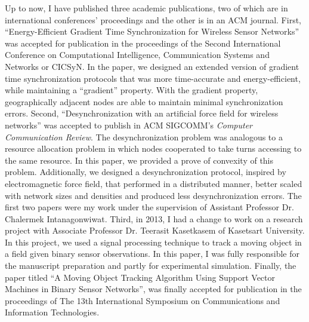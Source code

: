 \documentclass[a4paper,10pt]{report}
\begin{document}
\vspace{0.2cm}
Up to now, I have published three academic publications, two of which are in international conferences' proceedings and the other is in an ACM journal.  First, ``Energy-Efficient Gradient Time Synchronization for Wireless Sensor Networks'' was accepted for publication in the proceedings of the Second International Conference on Computational Intelligence, Communication Systems and Networks or CICSyN. In the paper, we designed an extended version of gradient time synchronization protocols that was more time-accurate and energy-efficient, while maintaining a ``gradient'' property. With the gradient property, geographically adjacent nodes are able to maintain minimal synchronization errors. Second, ``Desynchronization with an artificial force field for wireless networks'' was accepted to publish in ACM SIGCOMM's \textit{Computer Communication Review}. The desynchronization problem was analogous to a resource allocation problem in which nodes cooperated to take turns accessing to the same resource. In this paper, we provided a prove of convexity of this problem. Additionally, we designed a desynchronization protocol, inspired by electromagnetic force field, that performed in a distributed manner, better scaled with network sizes and densities and produced less desynchronization errors. The first two papers were my work under the supervision of Assistant Professor Dr. Chalermek Intanagonwiwat. Third, in 2013, I had a change to work on a research project with Associate Professor Dr. Teerasit Kasetkasem of Kasetsart University. In this project, we used a signal processing technique to track a moving object in a field given binary sensor observations. In this paper, I was fully responsible for the manuscript preparation and partly for experimental simulation. Finally, the paper titled ``A Moving Object Tracking Algorithm Using Support Vector Machines in Binary Sensor Networks'', was finally accepted for publication in the proceedings of The 13th International Symposium on Communications and Information Technologies.
\end{document}

